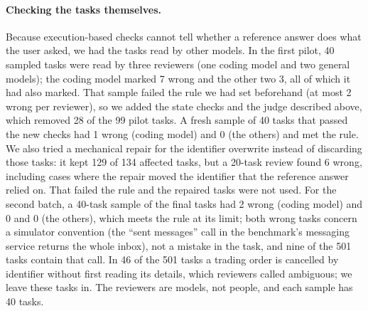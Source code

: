 \paragraph{Checking the tasks themselves.} Because execution-based checks cannot tell whether a reference answer does what the user asked, we had the tasks read by other models. In the first pilot, 40 sampled tasks were read by three reviewers (one coding model and two general models); the coding model marked 7 wrong and the other two 3, all of which it had also marked. That sample failed the rule we had set beforehand (at most 2 wrong per reviewer), so we added the state checks and the judge described above, which removed 28 of the 99 pilot tasks. A fresh sample of 40 tasks that passed the new checks had 1 wrong (coding model) and 0 (the others) and met the rule. We also tried a mechanical repair for the identifier overwrite instead of discarding those tasks: it kept 129 of 134 affected tasks, but a 20-task review found 6 wrong, including cases where the repair moved the identifier that the reference answer relied on. That failed the rule and the repaired tasks were not used. For the second batch, a 40-task sample of the final tasks had 2 wrong (coding model) and 0 and 0 (the others), which meets the rule at its limit; both wrong tasks concern a simulator convention (the ``sent messages'' call in the benchmark's messaging service returns the whole inbox), not a mistake in the task, and nine of the 501 tasks contain that call. In 46 of the 501 tasks a trading order is cancelled by identifier without first reading its details, which reviewers called ambiguous; we leave these tasks in. The reviewers are models, not people, and each sample has 40 tasks. %

